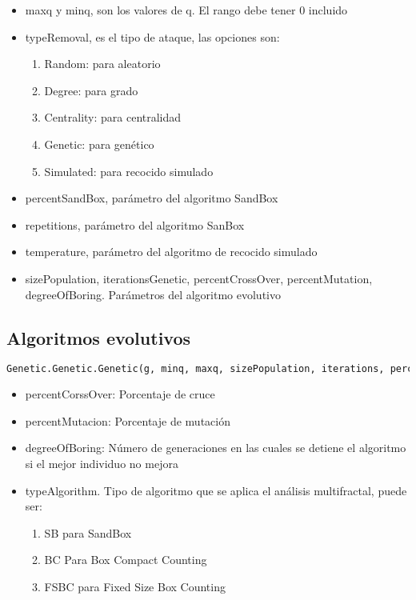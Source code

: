\begin{itemize}
    \item maxq y minq, son los valores de q. El rango debe tener 0 incluido
    \item typeRemoval, es el tipo de ataque, las opciones son:
    \begin{enumerate}
        \item Random: para aleatorio
        \item Degree: para grado
        \item Centrality: para centralidad
        \item Genetic: para genético
        \item Simulated: para recocido simulado
    \end{enumerate}
    \item percentSandBox, parámetro del algoritmo SandBox
    \item repetitions, parámetro del algoritmo SanBox
    \item temperature, parámetro del algoritmo de recocido simulado
    \item  sizePopulation, iterationsGenetic, percentCrossOver, percentMutation, degreeOfBoring. Parámetros del algoritmo evolutivo
\end{itemize}

\subsection{Algoritmos evolutivos}

\begin{lstlisting}[language=python]
Genetic.Genetic.Genetic(g, minq, maxq, sizePopulation, iterations, percentCrossOver, percentMutation, degreeOfBoring, typeAlgorithm)
\end{lstlisting}

\begin{itemize}
    \item percentCorssOver: Porcentaje de cruce
    \item percentMutacion: Porcentaje de mutación
    \item degreeOfBoring: Número de generaciones en las cuales se detiene el algoritmo si el mejor individuo no mejora
    \item typeAlgorithm. Tipo de algoritmo que se aplica el análisis multifractal, puede ser:
    \begin{enumerate}
        \item SB para SandBox
        \item BC Para Box Compact Counting
        \item FSBC para Fixed Size Box Counting
    \end{enumerate}
\end{itemize}

